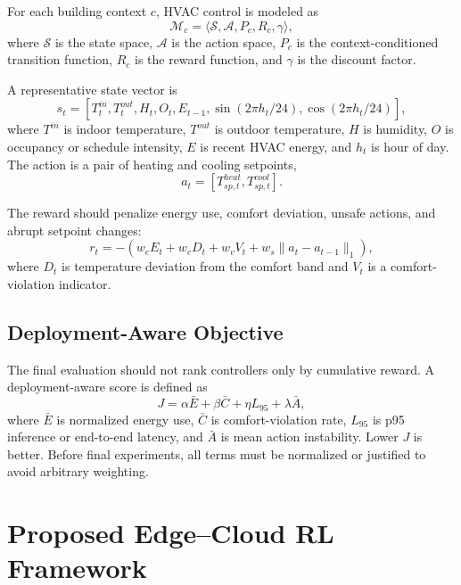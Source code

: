 \documentclass[11pt,a4paper]{article}
\begin{document}
For each building context $c$, HVAC control is modeled as
\begin{equation}
\mathcal{M}_c = \langle \mathcal{S}, \mathcal{A}, P_c, R_c, \gamma \rangle,
\end{equation}
where $\mathcal{S}$ is the state space, $\mathcal{A}$ is the action space, $P_c$ is the context-conditioned transition function, $R_c$ is the reward function, and $\gamma$ is the discount factor.

A representative state vector is
\begin{equation}
s_t = [T^{in}_t, T^{out}_t, H_t, O_t, E_{t-1}, \sin(2\pi h_t/24), \cos(2\pi h_t/24)],
\end{equation}
where $T^{in}$ is indoor temperature, $T^{out}$ is outdoor temperature, $H$ is humidity, $O$ is occupancy or schedule intensity, $E$ is recent HVAC energy, and $h_t$ is hour of day. The action is a pair of heating and cooling setpoints,
\begin{equation}
a_t = [T^{heat}_{sp,t}, T^{cool}_{sp,t}].
\end{equation}

The reward should penalize energy use, comfort deviation, unsafe actions, and abrupt setpoint changes:
\begin{equation}
r_t = -\left(w_e E_t + w_c D_t + w_v V_t + w_s \lVert a_t-a_{t-1}\rVert_1\right),
\end{equation}
where $D_t$ is temperature deviation from the comfort band and $V_t$ is a comfort-violation indicator.

\subsection{Deployment-Aware Objective}

The final evaluation should not rank controllers only by cumulative reward. A deployment-aware score is defined as
\begin{equation}
J = \alpha \bar{E} + \beta \bar{C} + \eta L_{95} + \lambda \bar{A},
\end{equation}
where $\bar{E}$ is normalized energy use, $\bar{C}$ is comfort-violation rate, $L_{95}$ is p95 inference or end-to-end latency, and $\bar{A}$ is mean action instability. Lower $J$ is better. Before final experiments, all terms must be normalized or justified to avoid arbitrary weighting.

\section{Proposed Edge--Cloud RL Framework}
\end{document}
